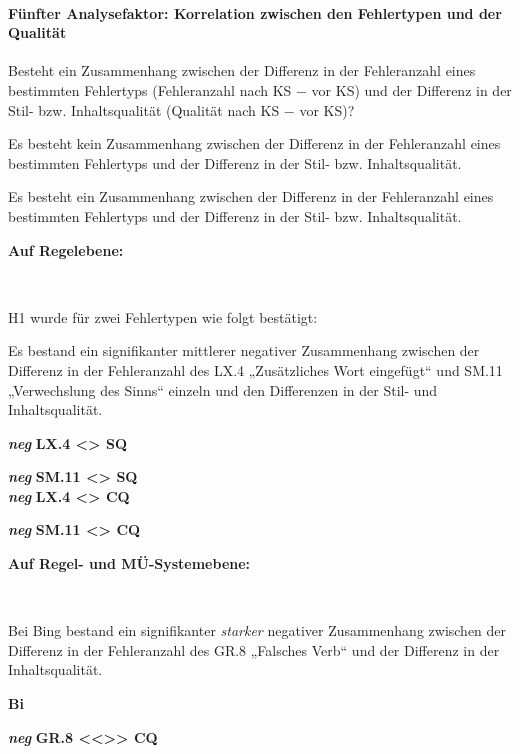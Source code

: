 \paragraph*{Fünfter Analysefaktor: Korrelation zwischen den Fehlertypen und der Qualität}
\begin{description}[font=\normalfont\bfseries]
\item [Fragestellung:] Besteht ein Zusammenhang zwischen der Differenz in der Fehleranzahl eines bestimmten Fehlertyps (Fehleranzahl nach KS $-$ vor KS) und der Differenz in der Stil- bzw. Inhaltsqualität (Qualität nach KS $-$ vor KS)?
\item [H0 --] Es besteht kein Zusammenhang zwischen der Differenz in der Fehleranzahl eines bestimmten Fehlertyps und der Differenz in der Stil- bzw. Inhaltsqualität.
\item [H1 --] Es besteht ein Zusammenhang zwischen der Differenz in der Fehleranzahl eines bestimmten Fehlertyps und der Differenz in der Stil- bzw. Inhaltsqualität.
\newpage
\item [Resultat]
\end{description}
\noindent
\parbox[t]{.7\textwidth}{\textbf{Auf Regelebene:}}\\
\parbox[t]{.7\textwidth}{
H1 wurde für zwei Fehlertypen wie folgt bestätigt:

Es bestand ein signifikanter mittlerer negativer Zusammenhang zwischen der Differenz in der Fehleranzahl des LX.4 „Zusätzliches Wort eingefügt“ und SM.11 „Verwechslung des Sinns“ einzeln und den Differenzen in der Stil- und Inhaltsqualität.
}
\parbox[t]{.04\textwidth}{}
\colorbox{smGreen}{\parbox[t]{.25\textwidth}{
{ \textbf{\textit{neg}} \textbf{LX.4 <> SQ}}

{ \textbf{\textit{neg}} \textbf{SM.11 <> SQ}}\\

{ \textbf{\textit{neg}} \textbf{LX.4 <> CQ}}

{ \textbf{\textit{neg}} \textbf{SM.11 <> CQ}}\\
}}

\noindent
\parbox[t]{.7\textwidth}{\textbf{Auf Regel- und MÜ-Systemebene:}}\\
\parbox[t]{.7\textwidth}{
Bei Bing bestand ein signifikanter \textit{starker} negativer Zusammenhang zwischen der Differenz in der Fehleranzahl des GR.8 „Falsches Verb“ und der Differenz in der Inhaltsqualität.
}
\parbox[t]{.04\textwidth}{}
\colorbox{smGreen}{\parbox[t]{.25\textwidth}{
{ \textbf{Bi}}

 \textbf{\textit{neg}} \textbf{GR.8 <{}<{}>{}> CQ}\\
 \\
}}

